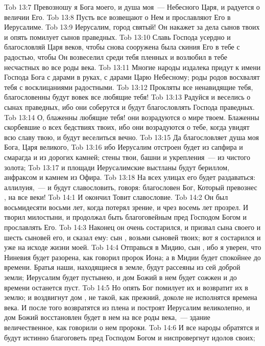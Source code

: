 \vs Tob 13:7 Превозношу я Бога моего, и душа моя~--- Небесного Царя, и радуется о величии Его.
\vs Tob 13:8 Пусть все возвещают о Нем и прославляют Его в Иерусалиме.
\vs Tob 13:9 Иерусалим, город святый! Он накажет  за дела сынов твоих и опять помилует сынов праведных.
\vs Tob 13:10 Славь Господа усердно и благословляй Царя веков, чтобы снова сооружена была скиния Его в тебе с радостью, чтобы Он возвеселил среди тебя пленных и возлюбил в тебе несчастных во все роды века.
\vs Tob 13:11 Многие народы издалека придут к имени Господа Бога с дарами в руках, с дарами Царю Небесному; роды родов восхвалят тебя с восклицаниями радостными.
\vs Tob 13:12 Прокляты все ненавидящие тебя, благословенны будут вовек все любящие тебя!
\vs Tob 13:13 Радуйся и веселись о сынах праведных, ибо они соберутся и будут благословлять Господа праведных.
\vs Tob 13:14 О, блаженны любящие тебя! они возрадуются о мире твоем. Блаженны скорбевшие о всех бедствиях твоих, ибо они возрадуются о тебе, когда увидят всю славу твою, и будут веселиться вечно.
\vs Tob 13:15 Да благословляет душа моя Бога, Царя великого,
\vs Tob 13:16 ибо Иерусалим отстроен будет из сапфира и смарагда и из дорогих камней; стены твои, башни и укрепления~--- из чистого золота;
\vs Tob 13:17 и площади Иерусалимские выстланы будут бериллом, анфраксом и камнем из Офира.
\vs Tob 13:18 На всех улицах его будет раздаваться: аллилуия,~--- и будут славословить, говоря: благословен Бог, Который превознес , на все веки!
\vs Tob 14:1 И окончил Товит славословие.
\rsbpar\vs Tob 14:2 Он был восьмидесяти восьми лет, когда потерял зрение, и чрез восемь лет прозрел. И творил милостыни, и продолжал быть благоговейным пред Господом Богом и прославлять Его.
\vs Tob 14:3 Наконец он очень состарился, и призвал сына своего и шесть сыновей его, и сказал ему: сын , возьми сыновей твоих; вот я состарился и уже на исходе жизни моей.
\vs Tob 14:4 Отправься в Мидию, сын , ибо я уверен, что Ниневия будет разорена, как говорил пророк Иона; а в Мидии будет спокойнее до времени. Братья наши, находящиеся в  земле, будут рассеяны из сей доброй земли; Иерусалим будет пустынею, и дом Божий в нем будет сожжен и до времени останется пуст.
\vs Tob 14:5 Но опять Бог помилует их и возвратит их в землю; и воздвигнут дом , не такой, как прежний, доколе не исполнятся времена века. И после того возвратятся из плена и построят Иерусалим великолепно, и дом Божий восстановлен будет в нем на все роды века,~--- здание величественное, как говорили о нем пророки.
\vs Tob 14:6 И все народы обратятся и будут истинно благоговеть пред Господом Богом и ниспровергнут идолов своих;

